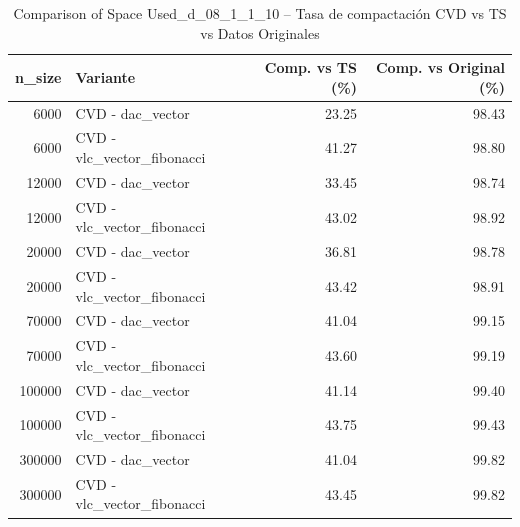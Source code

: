{    \begin{table}[H]
        \centering
        \label{tab:comparison of space used-d-08-1-1-10}
    \end{table}
        \begin{table}[H]
\centering
\caption{Comparison of Space Used\_d\_08\_1\_1\_10 – Tasa de compactación CVD vs TS vs Datos Originales}
\label{tab:Comparison of Space Used\_d\_08\_1\_1\_10_cvd_compactacion}
\begin{tabular}{rlrr}
\toprule
n\_size & Variante & Comp. vs TS (\%) & Comp. vs Original (\%) \\
\midrule
6000 & CVD - dac\_vector & 23.25 & 98.43 \\
6000 & CVD - vlc\_vector\_fibonacci & 41.27 & 98.80 \\
12000 & CVD - dac\_vector & 33.45 & 98.74 \\
12000 & CVD - vlc\_vector\_fibonacci & 43.02 & 98.92 \\
20000 & CVD - dac\_vector & 36.81 & 98.78 \\
20000 & CVD - vlc\_vector\_fibonacci & 43.42 & 98.91 \\
70000 & CVD - dac\_vector & 41.04 & 99.15 \\
70000 & CVD - vlc\_vector\_fibonacci & 43.60 & 99.19 \\
100000 & CVD - dac\_vector & 41.14 & 99.40 \\
100000 & CVD - vlc\_vector\_fibonacci & 43.75 & 99.43 \\
300000 & CVD - dac\_vector & 41.04 & 99.82 \\
300000 & CVD - vlc\_vector\_fibonacci & 43.45 & 99.82 \\
\bottomrule
\end{tabular}

\end{table}
}


